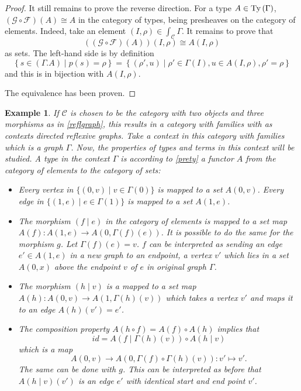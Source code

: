\documentclass[12pt,a4paper,twoside,xetex]{book}
\newtheorem{example}[theorem]{Example}
\begin{document}
\begin{proof}
It still remains to prove the reverse direction. For a type $A \in 
\text{Ty}\left(\Gamma\right)$, $(\mathcal{G} \circ \mathcal{F}) (A ) 
\cong A$ in the category of types, being presheaves on the category of 
elements. Indeed, take an element $(I,\rho) \in \int_{\mathcal{C}} \Gamma$. It 
remains to prove that  $$((\mathcal{G} \circ \mathcal{F}) (A )) (I,\rho) \cong 
A(I,\rho) $$ as sets. The left-hand side is by definition $$\left\{ s \in 
(\Gamma . A) \mid p(s) = \rho \right\} = \left\{ (\rho ', u) \mid \rho ' \in 
\Gamma (I), u \in A(I,\rho), \rho ' = \rho \right\}$$ and this is in bijection 
with  $A(I,\rho)$. 

The equivalence has been proven.


\end{proof}

\begin{example}
If $\mathcal{C}$ is chosen to be the category with two 
objects and three morphisms as in \cref{reflgraph}, this results in a 
category with families with as contexts directed reflexive graphs. Take a 
context in this category with families which is a graph $\Gamma$. Now, the 
properties of types and terms in this context will be studied. A type in the 
context $\Gamma$ is according to \cref{prety} a functor $A$ from the category 
of elements to the category of sets:
\begin{itemize}
\item Every vertex in $\{ (0, v) \mid v \in \Gamma (0) \}$ is mapped to a set 
$A(0,v)$. Every edge in $\{ (1, e) \mid e \in \Gamma (1) \}$ is mapped to a set 
$A(1,e)$.

\item The morphism $(f \mid e)$ in the category of elements is mapped to a set 
map $A(f): A(1,e) \rightarrow A(0, \Gamma (f) (e))$.  It is possible to do the 
same for the morphism $g$. Let $\Gamma (f) (e) =v$. $f$ can be interpreted as 
sending an edge $e' \in A(1,e)$ in a new graph to an endpoint, a vertex $v'$ 
which lies in a set $A(0, x)$ above the endpoint $v$ of $e$ in original graph 
$\Gamma$.
 
\item The morphism $(h \mid v)$ is a mapped to a set map $A(h) : A(0,v) 
\rightarrow A(1, \Gamma (h) (v) )$ which takes a vertex $v'$ and maps it to an 
edge $A(h)(v')=e'$.

\item The composition property $A(h \circ f) = A(f) \circ A(h)$ implies that 
$$id = A \left( f \mid \Gamma (h) (v) \right) \circ A \left( h \mid v \right)$$ 
which is a map $$A(0,v) \rightarrow A(0, \Gamma (f) \circ \Gamma (h) (v)): v' 
\mapsto v'.$$ The same can be done with $g$. This can be interpreted as before 
that $A(h \mid v)(v')$ is an edge $e'$ with identical start and end point $v'$.
\end{itemize}


\end{example}
\end{document}
